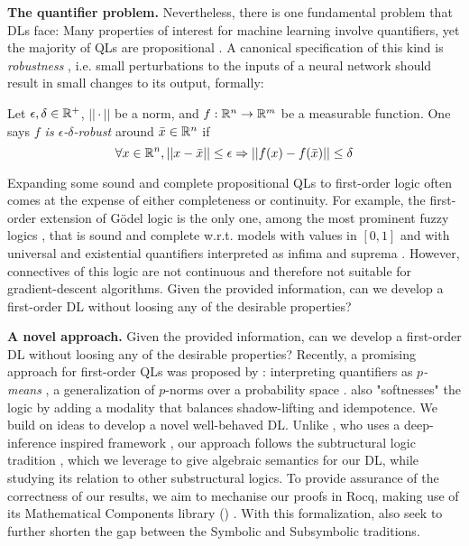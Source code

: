 
\textbf{The quantifier problem.} Nevertheless, there is one fundamental problem that DLs face: Many properties of interest for machine learning involve quantifiers, yet the majority of QLs are propositional \mcita{}. A canonical specification of this kind is  \textit{robustness} \mcita{},  i.e. small perturbations to the inputs of a neural network should result in small changes to its output, formally:
\begin{definition} %
\label{Robustness}%
    Let $\epsilon, \delta \in \mathbb{R}^+$, $||\cdot||$ be a norm, and $f : \mathbb{R}^n \rightarrow \mathbb{R}^m$ be a measurable function.
    One says \textit{$f$ is $\epsilon$-$\delta$-robust} around $\bar x \in \mathbb{R} ^ n$ if 
    \begin{equation}
    \label{eq:robustness}
        \forall x\in \mathbb{R}^n , ||x - \bar x|| \leq \epsilon \Rightarrow || 
			f(x) - f(\bar x)|| \leq \delta  
    \end{equation}
\end{definition}

Expanding some sound and complete propositional QLs to first-order logic often comes at the expense of either completeness or continuity.  
For example, the first-order extension of Gödel logic is the only one, among the most prominent fuzzy logics \mcita{}, that is sound and complete w.r.t. models with values in $[0,1]$ and with universal and existential quantifiers interpreted as infima and suprema \mcita{}.
However, connectives of this logic are not continuous and therefore not suitable for gradient-descent algorithms. Given the provided information, can we develop a first-order DL without loosing any of the desirable properties?  

\textbf{A novel approach.} Given the provided information, can we develop a first-order DL without loosing any of the desirable properties?   Recently, a promising approach for first-order QLs was proposed by \mcita{}: interpreting quantifiers as \textit{$p$-means} \mcita{}, a generalization of $p$-norms over a probability space \mcita{}. \mcita{} also "softnesses" the logic by adding a modality that balances shadow-lifting and idempotence. We build on \mcita{} ideas to develop a novel well-behaved DL. Unlike \mcita{}, who uses a deep-inference inspired framework \mcita{}, our approach follows the subtructural logic tradition \mcita{}, which we leverage to give algebraic semantics for our DL, while studying its relation to other substructural logics. To provide assurance of the correctness of our results, we aim to mechanise our proofs in Rocq, making use of its Mathematical Components library (\mathcomp{}) \cite{mathcomp}. With this formalization, also seek to further shorten the gap between the Symbolic and Subsymbolic traditions. 


